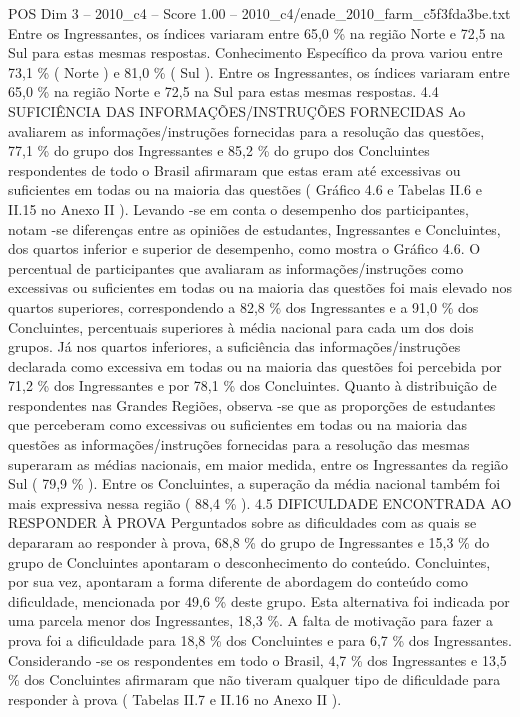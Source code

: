 \begin{textsample}{POS Dim 3 – 2010\_c4 – Score 1.00 – 2010\_c4/enade\_2010\_farm\_c5f3fda3be.txt}
Entre os Ingressantes, os índices variaram entre 65,0 \% na região Norte e 72,5 na Sul para estas mesmas respostas.
Conhecimento Específico da prova variou entre 73,1 \% ( Norte ) e 81,0 \% ( Sul ).
Entre os Ingressantes, os índices variaram entre 65,0 \% na região Norte e 72,5 na Sul para estas mesmas respostas. 4.4 SUFICIÊNCIA DAS INFORMAÇÕES/INSTRUÇÕES FORNECIDAS Ao avaliarem as informações/instruções fornecidas para a resolução das questões, 77,1 \% do grupo dos Ingressantes e 85,2 \% do grupo dos Concluintes respondentes de todo o Brasil afirmaram que estas eram até excessivas ou suficientes em todas ou na maioria das questões ( Gráfico 4.6 e Tabelas II.6 e II.15 no Anexo II ).
Levando -se em conta o desempenho dos participantes, notam -se diferenças entre as opiniões de estudantes, Ingressantes e Concluintes, dos quartos inferior e superior de desempenho, como mostra o Gráfico 4.6.
O percentual de participantes que avaliaram as informações/instruções como excessivas ou suficientes em todas ou na maioria das questões foi mais elevado nos quartos superiores, correspondendo a 82,8 \% dos Ingressantes e a 91,0 \% dos Concluintes, percentuais superiores à média nacional para cada um dos dois grupos.
Já nos quartos inferiores, a suficiência das informações/instruções declarada como excessiva em todas ou na maioria das questões foi percebida por 71,2 \% dos Ingressantes e por 78,1 \% dos Concluintes.
Quanto à distribuição de respondentes nas Grandes Regiões, observa -se que as proporções de estudantes que perceberam como excessivas ou suficientes em todas ou na maioria das questões as informações/instruções fornecidas para a resolução das mesmas superaram as médias nacionais, em maior medida, entre os Ingressantes da região Sul ( 79,9 \% ).
Entre os Concluintes, a superação da média nacional também foi mais expressiva nessa região ( 88,4 \% ). 4.5 DIFICULDADE ENCONTRADA AO RESPONDER À PROVA Perguntados sobre as dificuldades com as quais se depararam ao responder à prova, 68,8 \% do grupo de Ingressantes e 15,3 \% do grupo de Concluintes apontaram o desconhecimento do conteúdo.
Concluintes, por sua vez, apontaram a forma diferente de abordagem do conteúdo como dificuldade, mencionada por 49,6 \% deste grupo.
Esta alternativa foi indicada por uma parcela menor dos Ingressantes, 18,3 \%.
A falta de motivação para fazer a prova foi a dificuldade para 18,8 \% dos Concluintes e para 6,7 \% dos Ingressantes.
Considerando -se os respondentes em todo o Brasil, 4,7 \% dos Ingressantes e 13,5 \% dos Concluintes afirmaram que não tiveram qualquer tipo de dificuldade para responder à prova ( Tabelas II.7 e II.16 no Anexo II ).

\end{textsample}
